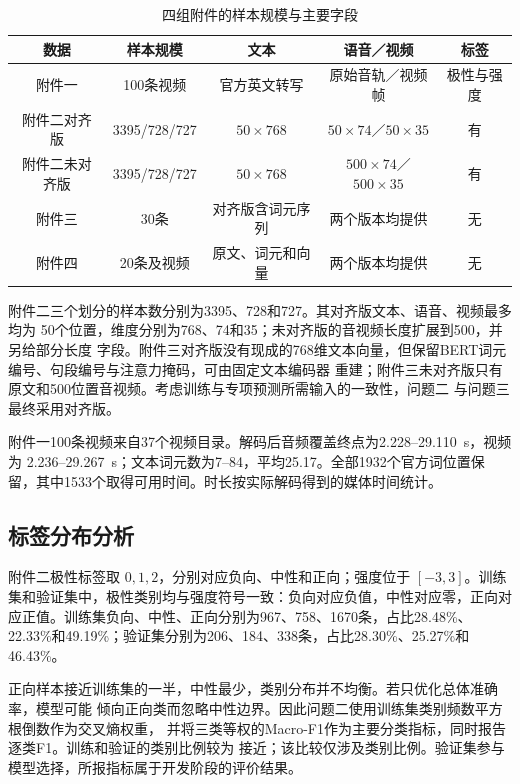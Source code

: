 \documentclass[bwprint]{gmcmthesis}
\begin{document}
\begin{table}[htbp]
 \centering
 \caption{四组附件的样本规模与主要字段}
 \label{tab:dataset-scale}
 \begin{tabular*}{\linewidth}{@{\extracolsep{\fill}}ccccc@{}}
 \toprule
 数据 & 样本规模 & 文本 & 语音／视频 & 标签 \\
 \midrule
 附件一 & 100条视频 & 官方英文转写 & 原始音轨／视频帧 & 极性与强度 \\
 附件二对齐版 & 3395/728/727 & $50\times768$ & $50\times74$／$50\times35$ & 有 \\
 附件二未对齐版 & 3395/728/727 & $50\times768$ & $500\times74$／$500\times35$ & 有 \\
 附件三 & 30条 & 对齐版含词元序列 & 两个版本均提供 & 无 \\
 附件四 & 20条及视频 & 原文、词元和向量 & 两个版本均提供 & 无 \\
 \bottomrule
 \end{tabular*}
\end{table}

附件二三个划分的样本数分别为3395、728和727。其对齐版文本、语音、视频最多均为
50个位置，维度分别为768、74和35；未对齐版的音视频长度扩展到500，并另给部分长度
字段。附件三对齐版没有现成的768维文本向量，但保留BERT词元编号、句段编号与注意力掩码，可由固定文本编码器
重建；附件三未对齐版只有原文和500位置音视频。考虑训练与专项预测所需输入的一致性，问题二
与问题三最终采用对齐版。

附件一100条视频来自37个视频目录。解码后音频覆盖终点为2.228--29.110~s，视频为
2.236--29.267~s；文本词元数为7--84，平均25.17。全部1932个官方词位置保留，其中1533个取得可用时间。时长按实际解码得到的媒体时间统计。

\subsection{标签分布分析}

附件二极性标签取 $0,1,2$，分别对应负向、中性和正向；强度位于 $[-3,3]$。训练集和验证集中，极性类别均与强度符号一致：负向对应负值，中性对应零，正向对应正值。训练集负向、中性、正向分别为967、758、1670条，占比28.48\%、
22.33\%和49.19\%；验证集分别为206、184、338条，占比28.30\%、25.27\%和46.43\%。

正向样本接近训练集的一半，中性最少，类别分布并不均衡。若只优化总体准确率，模型可能
倾向正向类而忽略中性边界。因此问题二使用训练集类别频数平方根倒数作为交叉熵权重，
并将三类等权的Macro-F1作为主要分类指标，同时报告逐类F1。训练和验证的类别比例较为
接近；该比较仅涉及类别比例。验证集参与模型选择，所报指标属于开发阶段的评价结果。
\end{document}
